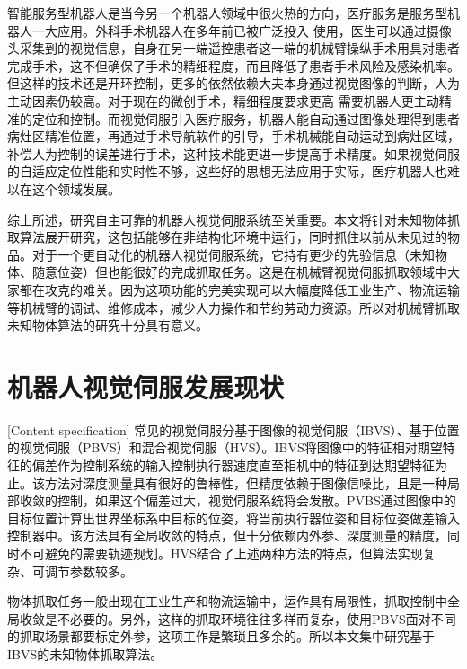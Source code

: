 \documentclass[fontset=fandol,type=bachelor,campus=harbin]{hithesisbook}
\begin{document}
智能服务型机器人是当今另一个机器人领域中很火热的方向，医疗服务是服务型机器人一大应用。外科手术机器人在多年前已被广泛投入
使用，医生可以通过摄像头采集到的视觉信息，自身在另一端遥控患者这一端的机械臂操纵手术用具对患者完成手术，这不但确保了手术的精细程度，而且降低了患者手术风险及感染机率\cite{机器人视觉伺服研究进展}。
但这样的技术还是开环控制，更多的依然依赖大夫本身通过视觉图像的判断，人为主动因素仍较高\cite{外文1,外文2}。对于现在的微创手术，精细程度要求更高
需要机器人更主动精准的定位和控制。而视觉伺服引入医疗服务，机器人能自动通过图像处理得到患者病灶区精准位置，再通过手术导航软件的引导，手术机械能自动运动到病灶区域，补偿人为控制的误差进行手术\cite{卢钰2016基于双目磁锚定手术机器人无标定视觉伺服控制研究}，这种技术能更进一步提高手术精度。如果视觉伺服的自适应定位性能和实时性不够，这些好的思想无法应用于实际，医疗机器人也难以在这个领域发展。


综上所述，研究自主可靠的机器人视觉伺服系统至关重要。本文将针对未知物体抓取算法展开研究，这包括能够在非结构化环境中运行，同时抓住以前从未见过的物品。对于一个更自动化的机器人视觉伺服系统，它持有更少的先验信息（未知物体、随意位姿）但也能很好的完成抓取任务。这是在机械臂视觉伺服抓取领域中大家都在攻克的难关。因为这项功能的完美实现可以大幅度降低工业生产、物流运输等机械臂的调试、维修成本，减少人力操作和节约劳动力资源。所以对机械臂抓取未知物体算法的研究十分具有意义。


\section{机器人视觉伺服发展现状}[Content specification]
常见的视觉伺服分基于图像的视觉伺服（IBVS）、基于位置的视觉伺服（PBVS）和混合视觉伺服（HVS）。IBVS将图像中的特征相对期望特征的偏差作为控制系统的输入控制执行器速度直至相机中的特征到达期望特征为止。该方法对深度测量具有很好的鲁棒性，但精度依赖于图像信噪比，且是一种局部收敛的控制，如果这个偏差过大，视觉伺服系统将会发散。PVBS通过图像中的目标位置计算出世界坐标系中目标的位姿，将当前执行器位姿和目标位姿做差输入控制器中。该方法具有全局收敛的特点，但十分依赖内外参、深度测量的精度，同时不可避免的需要轨迹规划。HVS结合了上述两种方法的特点，但算法实现复杂、可调节参数较多。


物体抓取任务一般出现在工业生产和物流运输中，运作具有局限性，抓取控制中全局收敛是不必要的。另外，这样的抓取环境往往多样而复杂，使用PBVS面对不同的抓取场景都要标定外参，这项工作是繁琐且多余的。所以本文集中研究基于IBVS的未知物体抓取算法。
\end{document}
